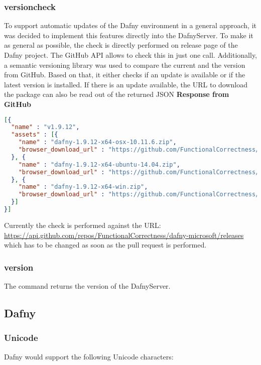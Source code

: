 \subsubsection{versioncheck}
To support automatic updates of the Dafny environment in a general approach, it was decided to implement this features directly into the DafnyServer. To make it as general as possible, the check is directly performed on release page of the Dafny project. The GitHub API allows to check this in just one call. Additionally, a semantic versioning library\cite{semver} was used to compare the current and the version from GitHub. Based on that, it either checks if an update is available or if the latest version is installed. If there is an update available, the URL to download the package can also be read out of the returned JSON 
\newline
\textbf{Response from GitHub}
\begin{lstlisting}[language=json,firstnumber=1]
[{
  "name" : "v1.9.12",
  "assets" : [{
    "name" : "dafny-1.9.12-x64-osx-10.11.6.zip",
    "browser_download_url" : "https://github.com/FunctionalCorrectness/dafny-microsoft/releases/download/v1.9.12/dafny-1.9.12-x64-osx-10.11.6.zip"
  }, {
    "name" : "dafny-1.9.12-x64-ubuntu-14.04.zip",
    "browser_download_url" : "https://github.com/FunctionalCorrectness/dafny-microsoft/releases/download/v1.9.12/dafny-1.9.12-x64-ubuntu-14.04.zip"
  }, {
    "name" : "dafny-1.9.12-x64-win.zip",
    "browser_download_url" : "https://github.com/FunctionalCorrectness/dafny-microsoft/releases/download/v1.9.12/dafny-1.9.12-x64-win.zip"
  }]
}]
\end{lstlisting}

Currently the check is performed against the URL:  \href{https://api.github.com/repos/FunctionalCorrectness/dafny-microsoft/releases}{https://api.github.com/repos/FunctionalCorrectness/dafny-microsoft/releases} which has to be changed as soon as the pull request is performed. 


\subsubsection{version}
The command returns the version of the DafnyServer.  


\subsection{Dafny}

\subsubsection{Unicode}
Dafny would support the following Unicode characters: 


